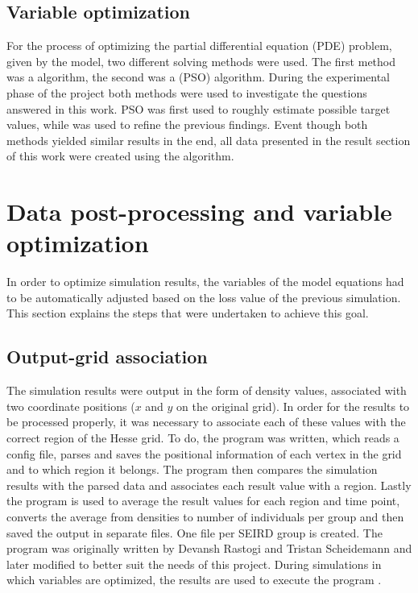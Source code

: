 \subsection{Variable optimization}
For the process of optimizing the partial differential equation (PDE) problem, given by the model, two different solving methods
were used. The first method was a  algorithm, the second was a  (PSO) algorithm.
During the experimental phase of the project both methods were used to investigate the questions answered in this work.
PSO was first used to roughly estimate possible target values, while  was used to refine the previous findings.
Event though both methods yielded similar results in the end, all data presented in the result section of this work were created
using the  algorithm. 

\section{Data post-processing and variable optimization}
\label{sec:post_proc}
In order to optimize simulation results, the variables of the model equations had to be automatically adjusted based on
the loss value of the previous simulation. This section explains the steps that were undertaken to achieve this goal.

\subsection{Output-grid association}
The simulation results were output in the form of density values, associated with two coordinate positions ($x$ and $y$ on the
original grid). In order for the results to be processed properly, it was necessary to associate each of these
values with the correct region of the Hesse grid. To do, the program  was written, which reads a config file,
parses and saves the positional information of each vertex in the grid and to which region it belongs. The program then compares the simulation results
with the parsed data and associates each result value with a region. Lastly the program  is used to average the result values
for each region and time point, converts the average from densities to number of individuals per group and then saved the output in separate files.
One file per SEIRD group is created. The program was originally written by Devansh Rastogi and Tristan Scheidemann and later modified to
better suit the needs of this project. During simulations in which variables are optimized, the results are used to execute the program .


